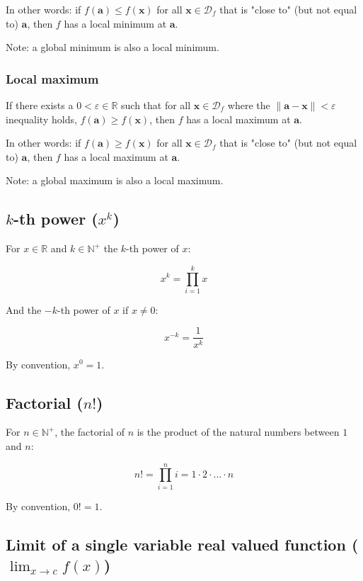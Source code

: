 \documentclass[titlepage]{article}
\begin{document}
          In other words: if $f(\mathbf{a}) \leq f(\mathbf{x})$ for all
          $\mathbf{x} \in \mathcal{D}_f$ that is "close to" (but not equal to)
          $\mathbf{a}$, then $f$ has a local minimum at $\mathbf{a}$.

          Note: a global minimum is also a local minimum.

        \subsubsection{Local maximum}

          If there exists a $0 < \varepsilon \in \mathbb{R}$ such that for all
          $\mathbf{x} \in \mathcal{D}_f$ where the
          $\| \mathbf{a} - \mathbf{x} \| < \varepsilon$ inequality holds,
          $f(\mathbf{a}) \geq f(\mathbf{x})$, then $f$ has a local maximum at
          $\mathbf{a}$.

          In other words: if $f(\mathbf{a}) \geq f(\mathbf{x})$ for all
          $\mathbf{x} \in \mathcal{D}_f$ that is "close to" (but not equal to)
          $\mathbf{a}$, then $f$ has a local maximum at $\mathbf{a}$.

          Note: a global maximum is also a local maximum.

      \subsection{$k$-th power ($x^k$)}

        For $x \in \mathbb{R}$ and $k \in \mathbb{N}^+$ the $k$-th power of $x$:

        $$x^k = \prod_{i=1}^k x$$

        And the $-k$-th power of $x$ if $x \neq 0$:

        $$x^{-k} = \frac{1}{x^k}$$

        By convention, $x^0 = 1$.

      \subsection{Factorial ($n!$)}

        For $n \in \mathbb{N}^+$, the factorial of $n$ is the product of
        the natural numbers between $1$ and $n$:

        $$n! = \prod_{i=1}^n i = 1 \cdot 2 \cdot \ldots \cdot n$$

        By convention, $0! = 1$.

      \subsection{%
        Limit of a single variable real valued function ($\lim_{x \to c} f(x)$)
      }
\end{document}
